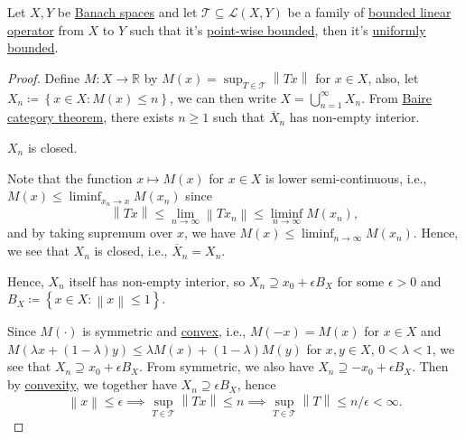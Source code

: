 \begin{theorem}\label{thm:uniform-boundedness}
	Let \(X, Y\) be \hyperref[def:Banach-space]{Banach spaces} and let \(\mathcal{T} \subseteq \mathcal{L} (X, Y)\) be a family of \hyperref[def:bounded-linear-op]{bounded linear operator} from \(X\) to \(Y\) such that it's \hyperref[def:point-wise-bounded]{point-wise bounded}, then it's \hyperref[def:uniformly-bounded]{uniformly bounded}.
\end{theorem}
\begin{proof}
	Define \(M\colon X\to \mathbb{R} \) by \(M(x) = \sup _{T\in \mathcal{T} }\left\lVert Tx\right\rVert \) for \(x\in X\), also, let \(X_n \coloneqq \left\{ x\in X\colon M(x) \leq n \right\}\), we can then write \(X = \bigcup_{n=1}^{\infty} X_n\). From \hyperref[prop:Baire-category]{Baire category theorem}, there exists \(n \geq 1\) such that \(\overline{X} _n\) has non-empty interior.
	\begin{claim}
		\(X_n\) is closed.
	\end{claim}
	\begin{explanation}
		Note that the function \(x \mapsto M(x)\) for \(x\in X\) is lower semi-continuous, i.e., \(M(x) \leq \liminf_{x_n \to x} M(x_n)\) since
		\[
			\left\lVert Tx\right\rVert \leq \lim\limits_{n \to \infty} \left\lVert Tx_n\right\rVert \leq \liminf_{n \to \infty} M(x_n),
		\]
		and by taking supremum over \(x\), we have \(M(x) \leq \liminf_{n \to \infty} M(x_n)\). Hence, we see that \(X_n\) is closed, i.e., \(\overline{X} _n = X_n\).
	\end{explanation}

	Hence, \(X_n\) itself has non-empty interior, so \(X_n \supseteq x_{0} + \epsilon B_X\) for some \(\epsilon > 0\) and \(B_X\coloneqq \left\{ x\in X\colon \left\lVert x\right\rVert \leq 1 \right\} \).

	Since \(M(\cdot)\) is symmetric and \hyperref[def:convex-function]{convex}, i.e., \(M(-x) = M(x)\) for \(x\in X\) and \(M(\lambda x + (1 - \lambda )y) \leq \lambda M(x) + (1 - \lambda )M(y)\) for \(x, y\in X\), \(0 < \lambda < 1\), we see that \(X_n \supseteq x_0 + \epsilon B_X\). From symmetric, we also have \(X_n \supseteq -x_0 + \epsilon B_X\). Then by \hyperref[def:convex-function]{convexity}, we together have \(X_n \supseteq \epsilon B_X\), hence
	\[
		\left\lVert x\right\rVert \leq \epsilon \implies \sup _{T\in \mathcal{T} } \left\lVert Tx\right\rVert \leq n\implies \sup _{T\in \mathcal{T} } \left\lVert T\right\rVert \leq n / \epsilon  < \infty.
	\]
\end{proof}


